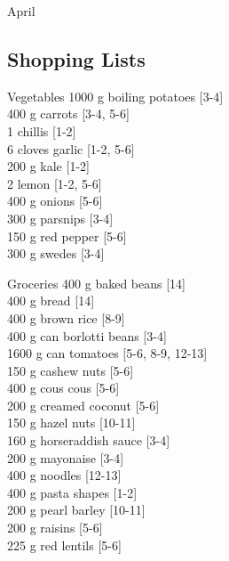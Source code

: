 \begin{menu}{April}
    \subsection*{Shopping Lists}
      \begin{shoppinglist}{Vegetables}
      1000 g boiling potatoes {\scriptsize[3-4]}\\
      400 g carrots {\scriptsize[3-4, 5-6]}\\
      1  chillis {\scriptsize[1-2]}\\
      6 cloves garlic {\scriptsize[1-2, 5-6]}\\
      200 g kale {\scriptsize[1-2]}\\
      2  lemon {\scriptsize[1-2, 5-6]}\\
      400 g onions {\scriptsize[5-6]}\\
      300 g parsnips {\scriptsize[3-4]}\\
      150 g red pepper {\scriptsize[5-6]}\\
      300 g swedes {\scriptsize[3-4]}\\
      \end{shoppinglist}%
      \begin{shoppinglist}{Groceries}
      400 g baked beans {\scriptsize[14]}\\
      400 g bread {\scriptsize[14]}\\
      400 g brown rice {\scriptsize[8-9]}\\
      400 g can borlotti beans {\scriptsize[3-4]}\\
      1600 g can tomatoes {\scriptsize[5-6, 8-9, 12-13]}\\
      150 g cashew nuts {\scriptsize[5-6]}\\
      400 g cous cous {\scriptsize[5-6]}\\
      200 g creamed coconut {\scriptsize[5-6]}\\
      150 g hazel nuts {\scriptsize[10-11]}\\
      160 g horseraddish sauce {\scriptsize[3-4]}\\
      200 g mayonaise {\scriptsize[3-4]}\\
      400 g noodles {\scriptsize[12-13]}\\
      400 g pasta shapes {\scriptsize[1-2]}\\
      200 g pearl barley {\scriptsize[10-11]}\\
      200 g raisins {\scriptsize[5-6]}\\
      225 g red lentils {\scriptsize[5-6]}\\

\end{shoppinglist}
\end{menu}
